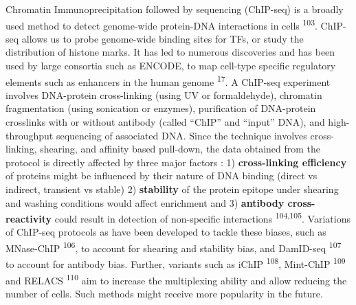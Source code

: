 \documentclass[11pt,twoside]{MPIthesis}
\theoremstyle{definition}
\theoremstyle{definition}
\theoremstyle{definition}
\theoremstyle{remark}
\begin{document}
Chromatin Immunoprecipitation followed by sequencing (ChIP-seq) is a
broadly used method to detect genome-wide protein-DNA interactions in
cells \textsuperscript{103}. ChIP-seq allows us to probe genome-wide
binding sites for TFs, or study the distribution of histone marks. It
has led to numerous discoveries and has been used by large consortia
such as ENCODE, to map cell-type specific regulatory elements such as
enhancers in the human genome \textsuperscript{17}. A ChIP-seq
experiment involves DNA-protein cross-linking (using UV or
formaldehyde), chromatin fragmentation (using sonication or enzymes),
purification of DNA-protein crosslinks with or without antibody (called
``ChIP'' and ``input'' DNA), and high-throughput sequencing of
associated DNA. Since the technique involves cross-linking, shearing,
and affinity based pull-down, the data obtained from the protocol is
directly affected by three major factors : 1) \textbf{cross-linking
efficiency} of proteins might be influenced by their nature of DNA
binding (direct vs indirect, transient vs stable) 2) \textbf{stability}
of the protein epitope under shearing and washing conditions would
affect enrichment and 3) \textbf{antibody cross-reactivity} could result
in detection of non-specific interactions \textsuperscript{104,105}.
Variations of ChIP-seq protocols as have been developed to tackle these
biases, such as MNase-ChIP \textsuperscript{106}, to account for
shearing and stability bias, and DamID-seq \textsuperscript{107} to
account for antibody bias. Further, variants such as iChIP
\textsuperscript{108}, Mint-ChIP \textsuperscript{109} and RELACS
\textsuperscript{110} aim to increase the multiplexing ability and allow
reducing the number of cells. Such methods might receive more popularity
in the future.
\end{document}

